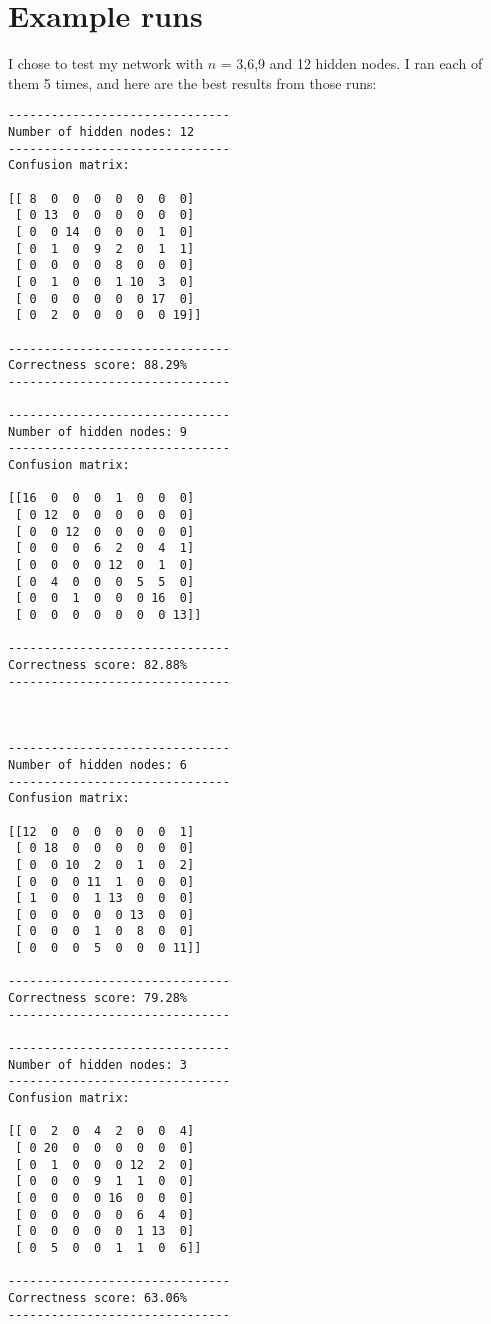 \documentclass[a4paper, norsk, 12pt]{article}
\begin{document}
\section{Example runs}
I chose to test my network with $n$ = 3,6,9 and 12 hidden nodes. I ran each of them 5 times, and here are the best results from those runs:

\begin{lstlisting}
-------------------------------
Number of hidden nodes: 12
-------------------------------
Confusion matrix:

[[ 8  0  0  0  0  0  0  0]
 [ 0 13  0  0  0  0  0  0]
 [ 0  0 14  0  0  0  1  0]
 [ 0  1  0  9  2  0  1  1]
 [ 0  0  0  0  8  0  0  0]
 [ 0  1  0  0  1 10  3  0]
 [ 0  0  0  0  0  0 17  0]
 [ 0  2  0  0  0  0  0 19]]

-------------------------------
Correctness score: 88.29%
-------------------------------

-------------------------------
Number of hidden nodes: 9
-------------------------------
Confusion matrix:

[[16  0  0  0  1  0  0  0]
 [ 0 12  0  0  0  0  0  0]
 [ 0  0 12  0  0  0  0  0]
 [ 0  0  0  6  2  0  4  1]
 [ 0  0  0  0 12  0  1  0]
 [ 0  4  0  0  0  5  5  0]
 [ 0  0  1  0  0  0 16  0]
 [ 0  0  0  0  0  0  0 13]]

-------------------------------
Correctness score: 82.88%
-------------------------------



-------------------------------
Number of hidden nodes: 6
-------------------------------
Confusion matrix:

[[12  0  0  0  0  0  0  1]
 [ 0 18  0  0  0  0  0  0]
 [ 0  0 10  2  0  1  0  2]
 [ 0  0  0 11  1  0  0  0]
 [ 1  0  0  1 13  0  0  0]
 [ 0  0  0  0  0 13  0  0]
 [ 0  0  0  1  0  8  0  0]
 [ 0  0  0  5  0  0  0 11]]

-------------------------------
Correctness score: 79.28%
-------------------------------

-------------------------------
Number of hidden nodes: 3
-------------------------------
Confusion matrix:

[[ 0  2  0  4  2  0  0  4]
 [ 0 20  0  0  0  0  0  0]
 [ 0  1  0  0  0 12  2  0]
 [ 0  0  0  9  1  1  0  0]
 [ 0  0  0  0 16  0  0  0]
 [ 0  0  0  0  0  6  4  0]
 [ 0  0  0  0  0  1 13  0]
 [ 0  5  0  0  1  1  0  6]]

-------------------------------
Correctness score: 63.06%
-------------------------------
\end{lstlisting}
\end{document}

